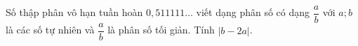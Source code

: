 \begin{ex}
Số thập phân vô hạn tuần hoàn $0{,}511111\ldots$ viết dạng phân số có dạng $\dfrac ab$ với $a;b$ là các số tự nhiên và $\dfrac ab$ là phân số tối giản. Tính $|b-2a|$.
\end{ex}
